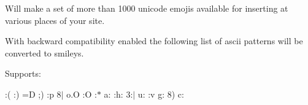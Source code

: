 Will make a set of more than 1000 unicode emojis available for inserting at various places of your site.

With \textquotesingle{}backward compatibility\textquotesingle{} enabled the following list of ascii patterns will be converted to smileys.

Supports\+:

\+:( \+:) =D ;) \+:p 8$\vert$ o.\+O \+:O \+:$\ast$ a\+: \+:h\+: 3\+:$\vert$ u\+: \+:v g\+: 8) c\+: 